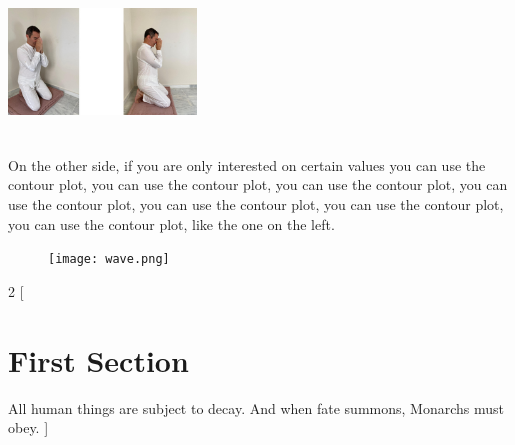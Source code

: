 \documentclass{article}
\begin{document}
\includegraphics[width=5cm, height=4cm]{vandami_man.jpg}

On the other side, if you are only interested on 
certain values you can use the contour plot, you 
can use the contour plot, you can use the contour 
plot, you can use the contour plot, you can use the 
contour plot, you can use the contour plot, 
you can use the contour plot, 
like the one on the left.

\begin{figure} %
    \centering
    \texttt{[image: wave.png]}
\end{figure}

\foreignlanguage{thai}{\Blindtext}




\begin{multicols*}{2}
[
\section{First Section}
All human things are subject to decay. And when fate summons, Monarchs must obey.
]
\Blindtext
\end{multicols*}
\end{document}

